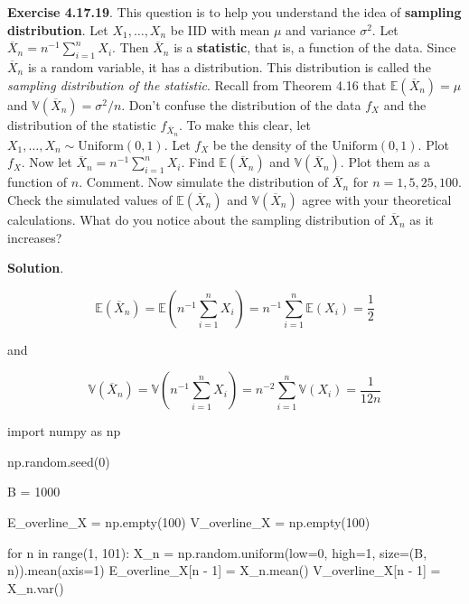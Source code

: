 \textbf{Exercise 4.17.19}. This question is to help you understand the
idea of \textbf{sampling distribution}. Let \(X_1, \dots, X_n\) be IID
with mean \(\mu\) and variance \(\sigma^2\). Let
\(\overline{X}_n  = n^{-1}\sum_{i=1}^n X_i\). Then \(\overline{X}_n\) is
a \textbf{statistic}, that is, a function of the data. Since
\(\overline{X}_n\) is a random variable, it has a distribution. This
distribution is called the \emph{sampling distribution of the
statistic}. Recall from Theorem 4.16 that
\(\mathbb{E}(\overline{X}_n) = \mu\) and
\(\mathbb{V}(\overline{X}_n) = \sigma^2 / n\). Don't confuse the
distribution of the data \(f_X\) and the distribution of the statistic
\(f_{\overline{X}_n}\). To make this clear, let
\(X_1, \dots, X_n \sim \text{Uniform}(0, 1)\). Let \(f_X\) be the
density of the \(\text{Uniform}(0, 1)\). Plot \(f_X\). Now let
\(\overline{X}_n = n^{-1} \sum_{i=1}^n X_i\). Find
\(\mathbb{E}(\overline{X}_n)\) and \(\mathbb{V}(\overline{X}_n)\). Plot
them as a function of \(n\). Comment. Now simulate the distribution of
\(\overline{X}_n\) for \(n = 1, 5, 25, 100\). Check the simulated values
of \(\mathbb{E}(\overline{X}_n)\) and \(\mathbb{V}(\overline{X}_n)\)
agree with your theoretical calculations. What do you notice about the
sampling distribution of \(\overline{X}_n\) as it increases?

\textbf{Solution}.

\[ \mathbb{E}\left(\overline{X}_n\right) = \mathbb{E}\left(n^{-1} \sum_{i=1}^n X_i \right) = n^{-1} \sum_{i=1}^n \mathbb{E}(X_i) = \frac{1}{2} \]

and

\[ \mathbb{V}\left(\overline{X}_n\right) = \mathbb{V}\left(n^{-1} \sum_{i=1}^n X_i \right) = n^{-2} \sum_{i=1}^n \mathbb{V}(X_i) = \frac{1}{12 n} \]

\begin{python}
import numpy as np

np.random.seed(0)

B = 1000

E_overline_X = np.empty(100)
V_overline_X = np.empty(100)

for n in range(1, 101):
    X_n = np.random.uniform(low=0, high=1, size=(B, n)).mean(axis=1)
    E_overline_X[n - 1] = X_n.mean()
    V_overline_X[n - 1] = X_n.var()
\end{python}

